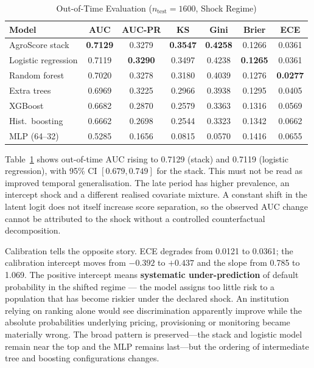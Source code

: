 \documentclass[journal]{IEEEtran}
\newcommand{\auc}{\mbox{AUC}}
\begin{document}
\begin{table}[!t]
\caption{Out-of-Time Evaluation ($n_{\text{test}}=1600$, Shock Regime)}
\label{tab:oot}
\centering
\footnotesize
\begin{tabular}{@{}lcccccc@{}}
\toprule
Model & AUC & AUC-PR & KS & Gini & Brier & ECE \\
\midrule
AgroScore stack & \textbf{0.7129} & 0.3279 & \textbf{0.3547} & \textbf{0.4258} & 0.1266 & 0.0361 \\
Logistic regression & 0.7119 & \textbf{0.3290} & 0.3497 & 0.4238 & \textbf{0.1265} & 0.0361 \\
Random forest & 0.7020 & 0.3278 & 0.3180 & 0.4039 & 0.1276 & \textbf{0.0277} \\
Extra trees & 0.6969 & 0.3225 & 0.2966 & 0.3938 & 0.1295 & 0.0405 \\
XGBoost & 0.6682 & 0.2870 & 0.2579 & 0.3363 & 0.1316 & 0.0569 \\
Hist.\ boosting & 0.6662 & 0.2698 & 0.2544 & 0.3323 & 0.1342 & 0.0662 \\
MLP (64--32) & 0.5285 & 0.1656 & 0.0815 & 0.0570 & 0.1416 & 0.0655 \\
\bottomrule
\end{tabular}
\end{table}

Table~\ref{tab:oot} shows out-of-time $\auc$ rising to 0.7129 (stack) and 0.7119 (logistic regression), with 95\% CI $[0.679,0.749]$ for the stack. This must not be read as improved temporal generalisation. The late period has higher prevalence, an intercept shock and a different realised covariate mixture. A constant shift in the latent logit does not itself increase score separation, so the observed AUC change cannot be attributed to the shock without a controlled counterfactual decomposition.

Calibration tells the opposite story. ECE degrades from 0.0121 to 0.0361; the calibration intercept moves from $-0.392$ to $+0.437$ and the slope from 0.785 to 1.069. The positive intercept means \textbf{systematic under-prediction} of default probability in the shifted regime --- the model assigns too little risk to a population that has become riskier under the declared shock. An institution relying on ranking alone would see discrimination apparently improve while the absolute probabilities underlying pricing, provisioning or monitoring became materially wrong. The broad pattern is preserved---the stack and logistic model remain near the top and the MLP remains last---but the ordering of intermediate tree and boosting configurations changes.
\end{document}
